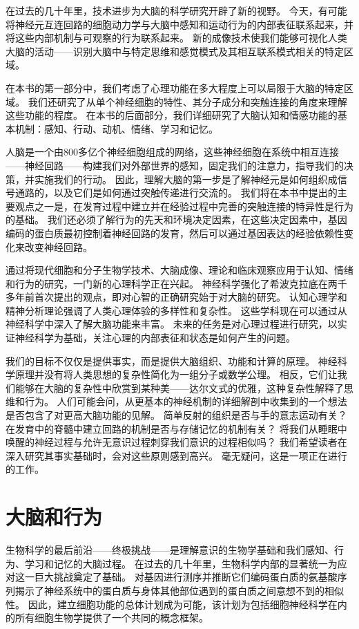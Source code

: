 在过去的几十年里，技术进步为大脑的科学研究开辟了新的视野。
今天，有可能将神经元互连回路的细胞动力学与大脑中感知和运动行为的内部表征联系起来，并将这些内部机制与可观察的行为联系起来。
新的成像技术使我们能够可视化人类大脑的活动——识别大脑中与特定思维和感觉模式及其相互联系模式相关的特定区域。


在本书的第一部分中，我们考虑了心理功能在多大程度上可以局限于大脑的特定区域。
我们还研究了从单个神经细胞的特性、其分子成分和突触连接的角度来理解这些功能的程度。
在本书的后面部分，我们详细研究了大脑认知和情感功能的基本机制：感知、行动、动机、情绪、学习和记忆。


人脑是一个由800多亿个神经细胞组成的网络，这些神经细胞在系统中相互连接——神经回路——构建我们对外部世界的感知，固定我们的注意力，指导我们的决策，并实施我们的行动。
因此，理解大脑的第一步是了解神经元是如何组织成信号通路的，以及它们是如何通过突触传递进行交流的。
我们将在本书中提出的主要观点之一是，在发育过程中建立并在经验过程中完善的突触连接的特异性是行为的基础。
我们还必须了解行为的先天和环境决定因素，在这些决定因素中，基因编码的蛋白质最初控制着神经回路的发育，然后可以通过基因表达的经验依赖性变化来改变神经回路。


通过将现代细胞和分子生物学技术、大脑成像、理论和临床观察应用于认知、情绪和行为的研究，一门新的心理科学正在兴起。
神经科学强化了希波克拉底在两千多年前首次提出的观点，即对心智的正确研究始于对大脑的研究。
认知心理学和精神分析理论强调了人类心理体验的多样性和复杂性。
这些学科现在可以通过从神经科学中深入了解大脑功能来丰富。
未来的任务是对心理过程进行研究，以实证神经科学为基础，关注心理的内部表征和状态是如何产生的问题。


我们的目标不仅仅是提供事实，而是提供大脑组织、功能和计算的原理。
神经科学原理并没有将人类思想的复杂性简化为一组分子或数学公理。
相反，它们让我们能够在大脑的复杂性中欣赏到某种美——达尔文式的优雅，这种复杂性解释了思维和行为。
人们可能会问，从更基本的神经机制的详细解剖中收集到的一个想法是否包含了对更高大脑功能的见解。
简单反射的组织是否与手的意志运动有关？
在发育中的脊髓中建立回路的机制是否与存储记忆的机制有关？
将我们从睡眠中唤醒的神经过程与允许无意识过程刺穿我们意识的过程相似吗？
我们希望读者在深入研究其事实基础时，会对这些原则感到高兴。
毫无疑问，这是一项正在进行的工作。





\chapter{大脑和行为} \label{chap:chap1}
生物科学的最后前沿——终极挑战——是理解意识的生物学基础和我们感知、行为、学习和记忆的大脑过程。 
在过去的几十年里，生物科学内部的显著统一为应对这一巨大挑战奠定了基础。 
对基因进行测序并推断它们编码蛋白质的氨基酸序列揭示了神经系统中的蛋白质与身体其他部位遇到的蛋白质之间意想不到的相似性。 
因此，建立细胞功能的总体计划成为可能，该计划为包括细胞神经科学在内的所有细胞生物学提供了一个共同的概念框架。



